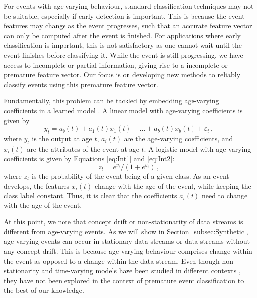 \documentclass[a4paper,11pt]{article}
\begin{document}

For events with age-varying behaviour, standard classification techniques may not be suitable, especially if early detection is important. This is because the event features may change as the event progresses, such that an accurate feature vector can only be computed after the event is finished. For applications where early classification is important, this is not satisfactory as one cannot wait until the event finishes before classifying it. While the event is still progressing, we have access to incomplete or partial information, giving rise to a  incomplete or premature feature vector. Our focus is on developing new methods to reliably classify events using this premature feature vector.

Fundamentally, this problem can be tackled by embedding age-varying coefficients in a learned model \citep{hastie1993varying}. A linear model with age-varying coefficients is given by
\begin{equation}\label{eq:Int1}
	y_t = a_0(t) + a_1(t) x_1(t) + \dots + a_b(t)x_b(t) + \varepsilon_t \, ,
\end{equation}
where $y_t$ is the output at age $t$, $a_i(t)$ are the age-varying coefficients, and $x_i(t)$ are the attributes of the event at age $t$. A logistic model with age-varying coefficients is given by Equations \eqref{eq:Int1} and \eqref{eq:Int2}:
\begin{equation}\label{eq:Int2}
	z_t = e^{y_t}/(1 + e^{y_t}) \, ,
\end{equation}
where $z_t$ is the probability of the event being of a given class. As an event develops, the features $x_i(t)$ change with the age of the event, while keeping the class label constant. Thus, it is clear that the coefficients $a_i(t)$ need to change with the age of the event.

At this point, we note that concept drift \citep{widmer1996learning, tsymbal2004problem,klinkenberg2000detecting,gama2014survey} or non-stationarity of data streams \citep{hulten2001mining, gama2010knowledge, gaber2005mining} is different from age-varying events. As we will show in Section~\ref{subsec:Synthetic}, age-varying events can occur in stationary data streams or data streams without any concept drift. This is because age-varying behaviour comprises change within the event as opposed to a change within the data stream. Even though non-stationarity and time-varying models have been studied in different contexts \citep{harvey1989time, wang1998cluster, hoover1998nonparametric}, they have not been explored in the context of premature event classification to the best of our knowledge.
\end{document}
